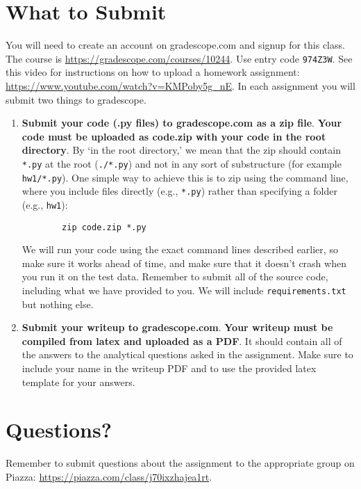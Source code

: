 \documentclass[11pt]{article}
\begin{document}
	\section{What to Submit}
	You will need to create an account on gradescope.com and signup for this class. The course is \href{https://gradescope.com/courses/10244}{\url{https://gradescope.com/courses/10244}}. Use entry code {\tt 974Z3W}. See this video for instructions on how to upload a homework assignment: \href{https://www.youtube.com/watch?v=KMPoby5g_nE}{\url{https://www.youtube.com/watch?v=KMPoby5g_nE}}. In each assignment you will submit two things to gradescope.
	\begin{enumerate}
		\item \textbf{Submit your code (.py files) to gradescope.com as a zip file}. \textbf{Your code must be uploaded as code.zip with your code in the root directory}. By `in the root directory,' we mean that the zip should contain \texttt{*.py} at the root (\texttt{./*.py}) and not in any sort of substructure (for example \texttt{hw1/*.py}). One simple way to achieve this is to zip using the command line, where you include files directly (e.g., \texttt{*.py}) rather than specifying a folder (e.g., \texttt{hw1}):
		\begin{verbatim}
		zip code.zip *.py
		\end{verbatim}
		
		We will run your code using the exact command lines described earlier, so make sure it works ahead of time, and make sure that it doesn't crash when you run it on the test data. Remember to submit all of the source code, including what we have provided to you. We will include {\tt requirements.txt} but nothing else.
		\item \textbf{Submit your writeup to gradescope.com}. \textbf{Your writeup must be compiled from latex and uploaded as a PDF}. It should contain all of the answers to the analytical questions asked in the assignment. Make sure to include your name in the writeup PDF and to use the provided latex template for your answers. 
	\end{enumerate}
	
	\section{Questions?}
	Remember to submit questions about the assignment to the appropriate group on Piazza: \href{https://piazza.com/class/j70ixzhajea1rt}{\url{https://piazza.com/class/j70ixzhajea1rt}}.
	
\end{document}
